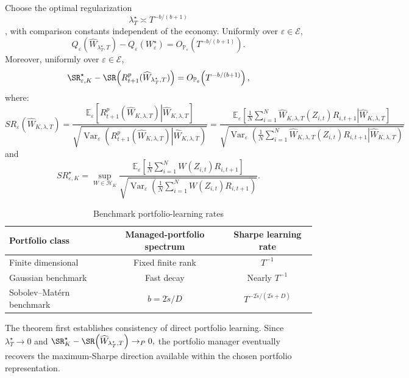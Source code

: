 \begin{theorem}
\label{thm:rate}
Choose the optimal regularization 
$$\lambda_T^\star\asymp T^{-b/(b+1)}$$, with comparison constants independent
of the economy. Uniformly over $\varepsilon\in\mathcal E$,
\begin{equation}
Q_\varepsilon(\widehat W_{\lambda_T^\star,T})
-
Q_\varepsilon(W^\star_\varepsilon)
=
O_{\mathbb P_\varepsilon}\!\left(T^{-b/(b+1)}\right).
\label{eq:portfolio-loss-rate}
\end{equation}
Moreover, uniformly over $\varepsilon\in\mathcal E$,
\begin{equation}
\SR^\star_{\varepsilon,K}
-
\SR\!\left(R^p_{t+1}(\widehat W_{\lambda_T^\star,T})\right)
=
O_{\mathbb P_\varepsilon}\!\left(T^{-b/(b+1)}\right),
\label{eq:sharpe-level-rate}
\end{equation}
where:
\[
SR_\varepsilon\!\left(\widehat W_{K,\lambda,T}\right)
=
\frac{
\mathbb E_\varepsilon
\left[
\left.
R^p_{t+1}\!\left(\widehat W_{K,\lambda,T}\right)
\right|
\widehat W_{K,\lambda,T}
\right]
}{
\sqrt{
\operatorname{Var}_\varepsilon
\left(
\left.
R^p_{t+1}\!\left(\widehat W_{K,\lambda,T}\right)
\right|
\widehat W_{K,\lambda,T}
\right)
}
}
=
\frac{
\displaystyle
\mathbb E_\varepsilon
\left[
\left.
\frac{1}{N}
\sum_{i=1}^N
\widehat W_{K,\lambda,T}(Z_{i,t})R_{i,t+1}
\right|
\widehat W_{K,\lambda,T}
\right]
}{
\displaystyle
\sqrt{
\operatorname{Var}_\varepsilon
\left(
\left.
\frac{1}{N}
\sum_{i=1}^N
\widehat W_{K,\lambda,T}(Z_{i,t})R_{i,t+1}
\right|
\widehat W_{K,\lambda,T}
\right)
}
}
\]
and
\[
SR^\star_{\varepsilon,K}
=
\sup_{W\in\mathcal H_K}
\frac{
\mathbb E_\varepsilon
\left[
\frac{1}{N}
\sum_{i=1}^N
W(Z_{i,t})R_{i,t+1}
\right]
}{
\sqrt{
\operatorname{Var}_\varepsilon
\left(
\frac{1}{N}
\sum_{i=1}^N
W(Z_{i,t})R_{i,t+1}
\right)
}
}.
\]
\end{theorem}
\begin{table}[H]
\centering
\caption{Benchmark portfolio-learning rates}
\label{tab:special-rates}
\small
\begin{tabular}{lcc}
\toprule
Portfolio class
&
Managed-portfolio spectrum
&
Sharpe learning rate
\\
\midrule
Finite dimensional
&
Fixed finite rank
&
$T^{-1}$
\\[5pt]

Gaussian benchmark
&
Fast decay
&
Nearly $T^{-1}$
\\[5pt]

Sobolev--Mat\'ern benchmark
&
$b=2\widetilde s/D$
&
$T^{-2\widetilde s/(2\widetilde s+D)}$
\\
\bottomrule
\end{tabular}

\par\smallskip
\end{table}
The theorem first establishes consistency of direct portfolio learning. Since
$\lambda_T^\star\rightarrow0$ and
$
\SR_K^\star
-
\SR\!\left(
\widehat W_{\lambda_T^\star,T}
\right)
\rightarrow_P0,
$
the portfolio manager eventually recovers the maximum-Sharpe direction
available within the chosen portfolio representation.

